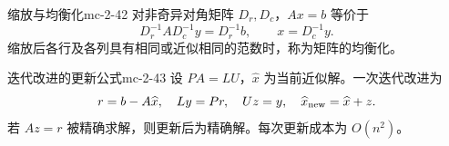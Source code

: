 \begin{definition}{缩放与均衡化}{mc-2-42}
对非奇异对角矩阵 $D_r,D_c$，$Ax=b$ 等价于
\[D_r^{-1}AD_c^{-1}y=D_r^{-1}b,\qquad x=D_c^{-1}y.\]
缩放后各行及各列具有相同或近似相同的范数时，称为矩阵的均衡化。
\end{definition}

\begin{proposition}{迭代改进的更新公式}{mc-2-43}
设 $PA=LU$，$\widehat x$ 为当前近似解。一次迭代改进为
\[r=b-A\widehat x,\quad Ly=Pr,\quad Uz=y,\quad\widehat x_{\rm new}=\widehat x+z.\]
若 $Az=r$ 被精确求解，则更新后为精确解。每次更新成本为 $O(n^2)$。
\end{proposition}
